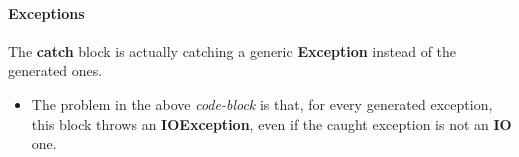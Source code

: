 
\paragraph{Exceptions}
\begin{itemize}
		\begin{itemize}
				The \textbf{catch} block
				is actually catching a generic \textbf{Exception} instead of the generated ones.
		\end{itemize}
	\checklist{53}
		\begin{itemize}
			\item
				The problem in the above \textit{code-block} is that, for every generated exception, this block throws an \textbf{IOException}, even if the caught exception is not an \textbf{IO} one.
		\end{itemize}
\end{itemize}


